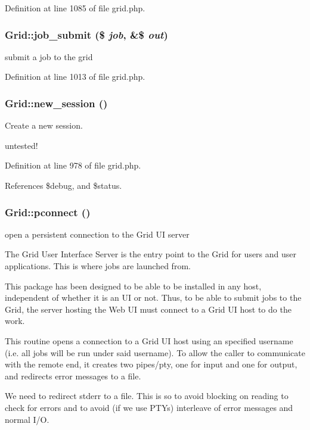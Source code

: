Definition at line 1085 of file grid.php.
\subsubsection{\setlength{\rightskip}{0pt plus 5cm}Grid::job\_\-submit (\$ {\em job}, \&\$ {\em out})}\label{classGrid_a22}


submit a job to the grid 



Definition at line 1013 of file grid.php.
\subsubsection{\setlength{\rightskip}{0pt plus 5cm}Grid::new\_\-session ()}\label{classGrid_a20}


Create a new session. 

untested! 

Definition at line 978 of file grid.php.

References \$debug, and \$status.
\subsubsection{\setlength{\rightskip}{0pt plus 5cm}Grid::pconnect ()}\label{classGrid_a9}


open a persistent connection to the Grid UI server 

The Grid User Interface Server is the entry point to the Grid for users and user applications. This is where jobs are launched from.

This package has been designed to be able to be installed in any host, independent of whether it is an UI or not. Thus, to be able to submit jobs to the Grid, the server hosting the Web UI must connect to a Grid UI host to do the work.

This routine opens a connection to a Grid UI host using an specified username (i.e. all jobs will be run under said username). To allow the caller to communicate with the remote end, it creates two pipes/pty, one for input and one for output, and redirects error messages to a file.

We need to redirect stderr to a file. This is so to avoid blocking on reading to check for errors and to avoid (if we use PTYs) interleave of error messages and normal I/O.

